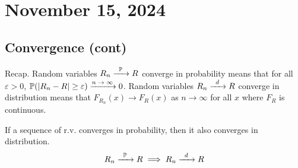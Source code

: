 \section{November 15, 2024}

\subsection{Convergence (cont)}
Recap. Random variables $R_n \ce{->[$\probability$]} R$ converge in probability means that for all $\varepsilon > 0$, $\probability(\abs{R_n - R} \ge \varepsilon) \ce{->[$n \to \infty$]} 0$. Random variables $R_n \ce{->[$d$]} R$ converge in distribution means that $F_{R_n}(x) \to F_{R}(x)$ as $n \to \infty$ for all $x$ where $F_R$ is continuous.

\begin{proposition}
    If a sequence of r.v. converges in probability, then it also converges in distribution.
    \begin{align}
        R_n \ce{->[$\probability$]} R \implies R_n \ce{->[$d$]} R
    \end{align}
\end{proposition}
